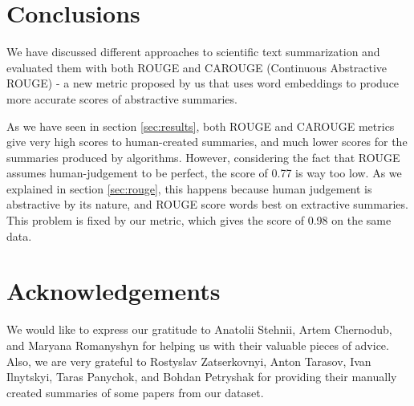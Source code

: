 \documentclass[sigplan]{acmart}
\begin{document}
\section*{Conclusions}

We have discussed different approaches to scientific text summarization and evaluated them with both ROUGE and CAROUGE (Continuous Abstractive ROUGE) - a new metric proposed by us that uses word embeddings to produce more accurate scores of abstractive summaries.

As we have seen in section \ref{sec:results}, both ROUGE and CAROUGE metrics give very high scores to human-created summaries, and much lower scores for the summaries produced by algorithms. However, considering the fact that ROUGE assumes human-judgement to be perfect, the score of 0.77 is way too low. As we explained in section \ref{sec:rouge}, this happens because human judgement is abstractive by its nature, and ROUGE score words best on extractive summaries. This problem is fixed by our metric, which gives the score of 0.98 on the same data.

\section*{Acknowledgements}

We would like to express our gratitude to Anatolii Stehnii, Artem Chernodub, and Maryana Romanyshyn for helping us with their valuable pieces of advice. Also, we are very grateful to Rostyslav Zatserkovnyi, Anton Tarasov, Ivan Ilnytskyi, Taras Panychok, and Bohdan Petryshak for providing their manually created summaries of some papers from our dataset.



\end{document}
